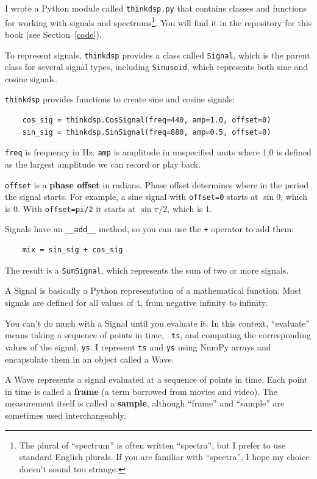\documentclass[12pt]{book}
\begin{document}
I wrote a Python module called {\tt thinkdsp.py} that contains classes
and functions for working with signals and spectrums\footnote{The
plural of ``spectrum'' is often written ``spectra'', but I prefer
to use standard English plurals.  If you are familiar with ``spectra'',
I hope my choice doesn't sound too strange.}.  You
will find it in the repository for this book (see Section~\ref{code}).

To represent signals, {\tt thinkdsp} provides a class called
{\tt Signal}, which is the parent class for several signal types,
including {\tt Sinusoid}, which represents both sine and cosine
signals.

{\tt thinkdsp} provides functions to create sine and cosine signals:

\begin{verbatim}
    cos_sig = thinkdsp.CosSignal(freq=440, amp=1.0, offset=0)
    sin_sig = thinkdsp.SinSignal(freq=880, amp=0.5, offset=0)
\end{verbatim}

{\tt freq} is frequency in Hz.  {\tt amp} is amplitude in unspecified
units where 1.0 is defined as the largest amplitude we can record or
play back.

{\tt offset} is a {\bf phase offset} in radians.  Phase offset
determines where in the period the signal starts.  For example, a
sine signal with {\tt offset=0} starts at $\sin 0$, which is 0.
With {\tt offset=pi/2} it starts at $\sin \pi/2$, which is 1.

Signals have an \verb"__add__" method, so you can use the {\tt +}
operator to add them:

\begin{verbatim}
    mix = sin_sig + cos_sig
\end{verbatim}

The result is a {\tt SumSignal}, which represents the sum of two
or more signals.

A Signal is basically a Python representation of a mathematical
function.  Most signals are defined for all values of {\tt t},
from negative infinity to infinity.

You can't do much with a Signal until you evaluate it.  In this
context, ``evaluate'' means taking a sequence of points in time, {\tt
  ts}, and computing the corresponding values of the signal, {\tt ys}.
I represent {\tt ts} and {\tt ys} using NumPy arrays and encapsulate
them in an object called a Wave.

A Wave represents a signal evaluated at a sequence of points in
time.  Each point in time is called a {\bf frame} (a term borrowed
from movies and video).  The measurement itself is called a
{\bf sample}, although ``frame'' and ``sample'' are sometimes
used interchangeably.
\end{document}
